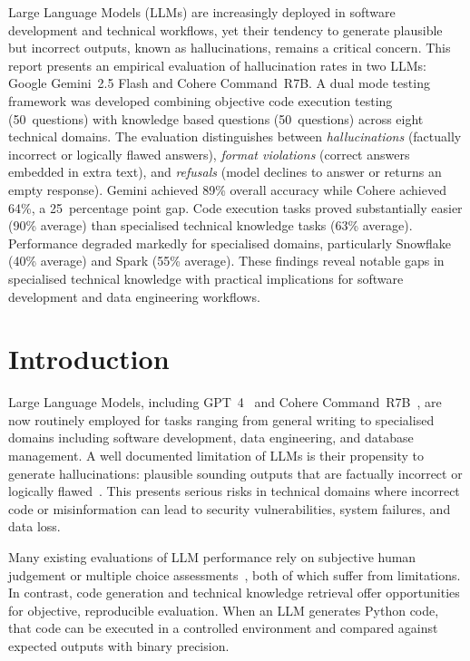 \documentclass[12pt,a4paper]{article}
\begin{document}
Large Language Models (LLMs) are increasingly deployed in software development and technical workflows, yet their tendency to generate plausible but incorrect outputs, known as hallucinations, remains a critical concern. This report presents an empirical evaluation of hallucination rates in two LLMs: Google Gemini~2.5 Flash and Cohere Command~R7B. A dual mode testing framework was developed combining objective code execution testing (50~questions) with knowledge based questions (50~questions) across eight technical domains. The evaluation distinguishes between \emph{hallucinations} (factually incorrect or logically flawed answers), \emph{format violations} (correct answers embedded in extra text), and \emph{refusals} (model declines to answer or returns an empty response). Gemini achieved 89\% overall accuracy while Cohere achieved 64\%, a 25~percentage point gap. Code execution tasks proved substantially easier (90\% average) than specialised technical knowledge tasks (63\% average). Performance degraded markedly for specialised domains, particularly Snowflake (40\% average) and Spark (55\% average). These findings reveal notable gaps in specialised technical knowledge with practical implications for software development and data engineering workflows.

\newpage

\section{Introduction}

Large Language Models, including GPT~4~\cite{achiam2023gpt4} and Cohere Command~R7B~\cite{gomez2024commandr7b}, are now routinely employed for tasks ranging from general writing to specialised domains including software development, data engineering, and database management. A well documented limitation of LLMs is their propensity to generate hallucinations: plausible sounding outputs that are factually incorrect or logically flawed~\cite{ji2023survey}. This presents serious risks in technical domains where incorrect code or misinformation can lead to security vulnerabilities, system failures, and data loss.

Many existing evaluations of LLM performance rely on subjective human judgement or multiple choice assessments~\cite{hendrycks2020measuring, lin2022truthfulqa}, both of which suffer from limitations. In contrast, code generation and technical knowledge retrieval offer opportunities for objective, reproducible evaluation. When an LLM generates Python code, that code can be executed in a controlled environment and compared against expected outputs with binary precision.
\end{document}
